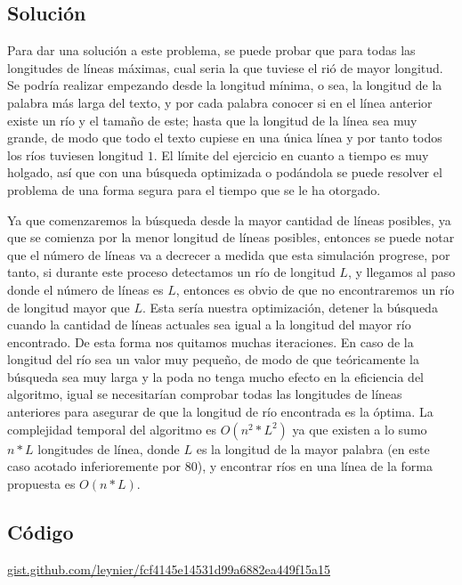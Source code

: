 \documentclass[12pt]{article}
\newcommand{\nl}{\vspace{0.3cm}}
\begin{document}
\subsection{Solución}

Para dar una solución a este problema, se puede probar que para todas las longitudes de líneas máximas, cual seria la que tuviese el rió de mayor longitud. Se podría realizar empezando desde la longitud mínima, o sea, la longitud de la palabra más larga del texto, y por cada palabra conocer si en el línea anterior existe un río y el tamaño de este; hasta que la longitud de la línea sea muy grande, de modo que todo el texto cupiese en una única línea y por tanto todos los ríos tuviesen longitud $1$. El límite del ejercicio en cuanto a tiempo es muy holgado, así que con una búsqueda optimizada o podándola se puede resolver el problema de una forma segura para el tiempo que se le ha otorgado. 

\nl

Ya que comenzaremos la búsqueda desde la mayor cantidad de líneas posibles, ya que se comienza por la menor longitud de líneas posibles, entonces se puede notar que el número de líneas va a decrecer a medida que esta simulación progrese, por tanto, si durante este proceso detectamos un río de longitud $L$, y llegamos al paso donde el número de líneas es $L$, entonces es obvio de que no encontraremos un río de longitud mayor que $L$. Esta sería nuestra optimización, detener la búsqueda cuando la cantidad de líneas actuales sea igual a la longitud del mayor río encontrado. De esta forma nos quitamos muchas iteraciones. En caso de la longitud del río sea un valor muy pequeño, de modo
de que teóricamente la búsqueda sea muy larga y la poda no tenga mucho efecto en la eficiencia del algoritmo, igual se necesitarían comprobar todas las longitudes de líneas anteriores para asegurar de que la longitud de río encontrada es la óptima. La complejidad temporal del algoritmo es $O(n^2*L^2)$ ya que existen a lo sumo $n*L$ longitudes de línea, donde $L$ es la longitud de la mayor palabra (en este caso acotado inferioremente por 80), y encontrar ríos en una línea de la forma propuesta es $O(n * L)$.

\subsection{Código}

\href{https://gist.github.com/leynier/fcf4145e14531d99a6882ea449f15a15}{gist.github.com/leynier/fcf4145e14531d99a6882ea449f15a15}

\newpage

\nocite{*}


\end{document}
